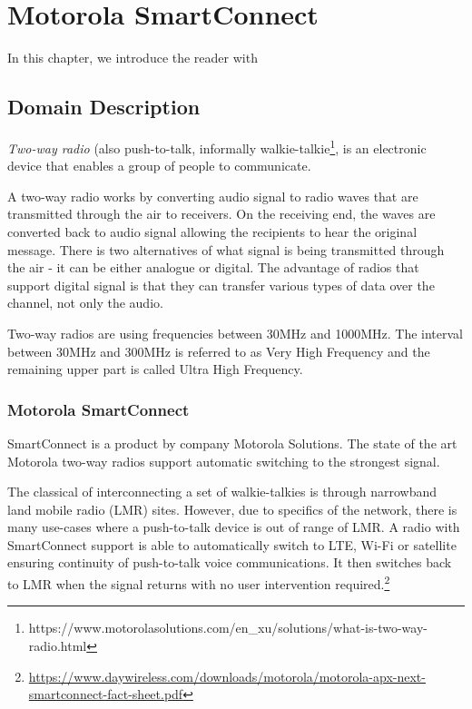 \chapter{Motorola SmartConnect}
In this chapter, we introduce the reader with 

\section{Domain Description}

\textit{Two-way radio} (also push-to-talk, informally walkie-talkie\footnote{https://www.motorolasolutions.com/en\_xu/solutions/what-is-two-way-radio.html}, is an electronic device that enables a group of people to communicate.

A two-way radio works by converting audio signal to radio waves that are transmitted through the air to receivers. On the receiving end, the waves are converted back to audio signal allowing the recipients to hear the original message.
There is two alternatives of what signal is being transmitted through the air - it can be either analogue or digital.
The advantage of radios that support digital signal is that they can transfer various types of data over the channel, not only the audio.

Two-way radios are using frequencies between 30MHz and 1000MHz. The interval between 30MHz and 300MHz is referred to as Very High Frequency and the remaining upper part is called Ultra High Frequency.



\subsection{Motorola SmartConnect}

SmartConnect is a product by company Motorola Solutions. 
The state of the art Motorola two-way radios support automatic switching to the strongest signal.

The classical of interconnecting a set of walkie-talkies is through narrowband land mobile radio (LMR) sites. 
However, due to specifics of the network, there is many use-cases where a push-to-talk device is out of range of LMR. A radio with SmartConnect support is able to automatically switch to LTE, Wi-Fi or satellite ensuring continuity of push-to-talk voice communications. It then switches back to LMR when the signal returns with no user intervention required.\footnote{\url{https://www.daywireless.com/downloads/motorola/motorola-apx-next-smartconnect-fact-sheet.pdf}}

